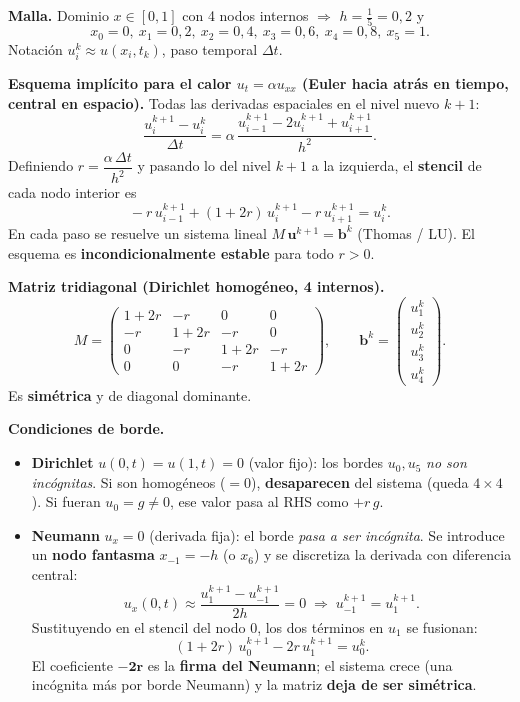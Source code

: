 \begin{teoria}
\textbf{Malla.} Dominio $x\in[0,1]$ con 4 nodos internos $\Rightarrow$ $h=\tfrac15=0{,}2$ y
\[
x_0=0,\ x_1=0{,}2,\ x_2=0{,}4,\ x_3=0{,}6,\ x_4=0{,}8,\ x_5=1.
\]
Notación $u_i^k\approx u(x_i,t_k)$, paso temporal $\Delta t$.

\medskip
\textbf{Esquema implícito para el calor $u_t=\alpha u_{xx}$ (Euler hacia atrás en tiempo, central en espacio).} Todas las derivadas espaciales en el nivel nuevo $k+1$:
\[
\frac{u_i^{k+1}-u_i^{k}}{\Delta t}=\alpha\,\frac{u_{i-1}^{k+1}-2u_i^{k+1}+u_{i+1}^{k+1}}{h^2}.
\]
Definiendo $r=\dfrac{\alpha\,\Delta t}{h^2}$ y pasando lo del nivel $k+1$ a la izquierda, el \textbf{stencil} de cada nodo interior es
\[
\boxed{\;-r\,u_{i-1}^{k+1}+(1+2r)\,u_i^{k+1}-r\,u_{i+1}^{k+1}=u_i^{k}.\;}
\]
En cada paso se resuelve un sistema lineal $M\,\mathbf u^{k+1}=\mathbf b^k$ (Thomas / LU). El esquema es \textbf{incondicionalmente estable} para todo $r>0$.

\medskip
\textbf{Matriz tridiagonal (Dirichlet homogéneo, 4 internos).}
\[
M=\begin{pmatrix}
1+2r & -r & 0 & 0\\
-r & 1+2r & -r & 0\\
0 & -r & 1+2r & -r\\
0 & 0 & -r & 1+2r
\end{pmatrix},\qquad
\mathbf b^k=\begin{pmatrix}u_1^k\\u_2^k\\u_3^k\\u_4^k\end{pmatrix}.
\]
Es \textbf{simétrica} y de diagonal dominante.

\medskip
\textbf{Condiciones de borde.}
\begin{itemize}
\item \textbf{Dirichlet} $u(0,t)=u(1,t)=0$ (valor fijo): los bordes $u_0,u_5$ \emph{no son incógnitas}. Si son homogéneos ($=0$), \textbf{desaparecen} del sistema (queda $4\times4$). Si fueran $u_0=g\ne0$, ese valor pasa al RHS como $+r\,g$.
\item \textbf{Neumann} $u_x=0$ (derivada fija): el borde \emph{pasa a ser incógnita}. Se introduce un \textbf{nodo fantasma} $x_{-1}=-h$ (o $x_6$) y se discretiza la derivada con diferencia central:
\[
u_x(0,t)\approx\frac{u_1^{k+1}-u_{-1}^{k+1}}{2h}=0\;\Longrightarrow\;u_{-1}^{k+1}=u_1^{k+1}.
\]
Sustituyendo en el stencil del nodo $0$, los dos términos en $u_1$ se fusionan:
\[
(1+2r)\,u_0^{k+1}-2r\,u_1^{k+1}=u_0^{k}.
\]
El coeficiente $\boldsymbol{-2r}$ es la \textbf{firma del Neumann}; el sistema crece (una incógnita más por borde Neumann) y la matriz \textbf{deja de ser simétrica}.
\end{itemize}
\end{teoria}

